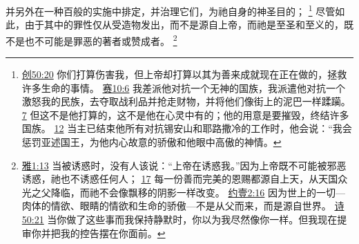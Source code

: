 \documentclass[12pt, a4paper, oneside]{ctexart}
\begin{document}
	并另外在一种百般的实施中排定，并治理它们，为祂自身的神圣目的；
	\footnote {
		\href{https://biblehub.com/genesis/50-20.htm}{创50:20} 你们打算伤害我，但上帝却打算以其为善来成就现在正在做的，拯救许多生命的事情。
		\href{https://biblehub.com/isaiah/10-6.htm}{赛10:6} 我差派他对抗一个无神的国族，我派遣他对抗一个激怒我的民族，去夺取战利品并抢走财物，并将他们像街上的泥巴一样蹂躏。
		\href{https://biblehub.com/isaiah/10-7.htm}{7} 但这不是他打算的，这不是他在心灵中有的；他的用意是要摧毁，终结许多国族。
		\href{https://biblehub.com/isaiah/10-12.htm}{12} 当主已结束他所有对抗锡安山和耶路撒冷的工作时，他会说：“我会惩罚亚述国王，为他内心故意的骄傲和他眼中高傲的神情。
	}
	尽管如此，由于其中的罪性仅从受造物发出，而不是源自上帝，而祂是至圣和至义的，既不是也不可能是罪恶的著者或赞成者。
	\footnote {
		\href{https://biblehub.com/james/1-13.htm}{雅1:13} 当被诱惑时，没有人该说：“上帝在诱惑我。”因为上帝既不可能被邪恶诱惑，祂也不诱惑任何人；
		\href{https://biblehub.com/james/1-17.htm}{17} 每一份善而完美的恩赐都源自上天，从天国众光之父降临，而祂不会像飘移的阴影一样改变。
		\href{https://biblehub.com/1_john/2-16.htm}{约壹2:16} 因为世上的一切---肉体的情欲、眼睛的情欲和生命的骄傲---不是从父而来，而是源自世界。
		\href{https://biblehub.com/psalms/50-21.htm}{诗50:21} 当你做了这些事而我保持静默时，你以为我尽然像你一样。但我现在提审你并把我的控告摆在你面前。
	}
\end{document}
